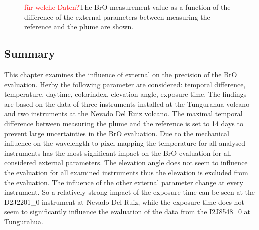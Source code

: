 \documentclass  [
  paper    = a4,
  BCOR     = 10mm,
  twoside,
  fontsize = 12pt,
  fleqn,
  toc      = bibnumbered,
  toc      = listofnumbered,
  numbers  = noendperiod,
  headings = normal,
  listof   = leveldown,
  version  = 3.03
]                                       {scrreprt}
\begin{document}
\begin{figure}
{}
\caption{\textcolor{red}{für welche Daten?}The BrO measurement value as a function of the difference of the external parameters between measuring the reference and the plume are shown.}
	\label{fig:difftempbroallinstruments}
\end{figure}
\FloatBarrier
	\subsection*{Summary}
This chapter examines the influence of external on the precision of the BrO evaluation. Herby the following parameter are considered: 
temporal difference, temperature, daytime, colorindex, elevation angle, exposure time.  The findings are based on the data of three instruments installed at the Tungurahua volcano and two instruments at the Nevado Del Ruiz volcano. The maximal temporal difference between measuring the plume and the reference is set to 14 days to prevent large uncertainties in the BrO evaluation. Due to the mechanical influence on the wavelength to pixel mapping the temperature for all analysed instruments has the most significant impact on the BrO evaluation for all considered external parameters. The elevation angle does not seem to influence the evaluation for all examined instruments thus the elevation is excluded from the evaluation. The influence of the other external parameter change at every instrument. So a relatively strong impact of the exposure time can be seen at the D2J2201\_0 instrument at Nevado Del Ruiz, while the exposure time does not seem to significantly influence the evaluation of the data from the  I2J8548\_0 at Tungurahua. 
	
\end{document}

